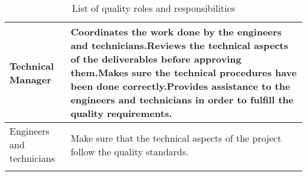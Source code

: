 \begin{longtable}[H]{>{\raggedright\arraybackslash}p{5cm} p{9cm}}
	Technical Manager & Coordinates the work done by the engineers and technicians.\vspace{0.3cm}\newline Reviews the technical aspects of the deliverables before approving them.\vspace{0.3cm}\newline Makes sure the technical procedures have been done correctly.\vspace{0.3cm}\newline Provides assistance to the engineers and technicians in order to fulfill the quality requirements.
	\vspace{0.2cm} \\
	
	\midrule
	
	Engineers and technicians & Make sure that the technical aspects of the project follow the quality standards. 
	\vspace{0.2cm} \\
	
	\bottomrule[2pt]
	
	\caption{List of quality roles and responsibilities}
	
\end{longtable}